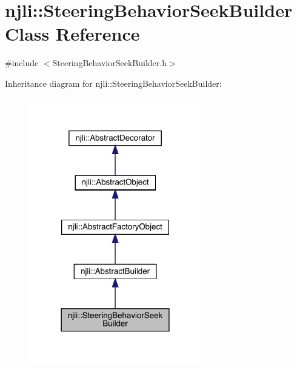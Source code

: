 \hypertarget{classnjli_1_1_steering_behavior_seek_builder}{}\section{njli\+:\+:Steering\+Behavior\+Seek\+Builder Class Reference}
\label{classnjli_1_1_steering_behavior_seek_builder}


{\ttfamily \#include $<$Steering\+Behavior\+Seek\+Builder.\+h$>$}



Inheritance diagram for njli\+:\+:Steering\+Behavior\+Seek\+Builder\+:\nopagebreak
\begin{figure}[H]
\begin{center}
\leavevmode
\includegraphics[width=213pt]{classnjli_1_1_steering_behavior_seek_builder__inherit__graph}
\end{center}
\end{figure}


